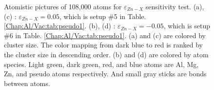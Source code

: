 \begin{figure}[!ht]
\caption[Atomistic pictures of 108,000 atoms for $\varepsilon_{Zn-X}$ sensitivity test.]{Atomistic pictures of 108,000 atoms for $\varepsilon_{Zn-X}$ sensitivity test. (a), (c) : $\varepsilon_{Zn-X} = 0.05$, which is setup \#5 in Table. \ref{Chap:Al/Vac:tab:pseudo1}. (b), (d) : $\varepsilon_{Zn-X} = -0.05$, which is setup \#6 in Table. \ref{Chap:Al/Vac:tab:pseudo1}. (a) and (c) are colored by cluster size. The color mapping from dark blue to red is ranked by the cluster size in descending order. (b) and (d) are colored by atom species. Light green, dark green, red, and blue atoms are Al, Mg, Zn, and pseudo atoms respectively. And small gray sticks are bonds between atoms.}
\label{Chap:Al/Vac:fig:sens_Zn}
\end{figure}
\endgroup
